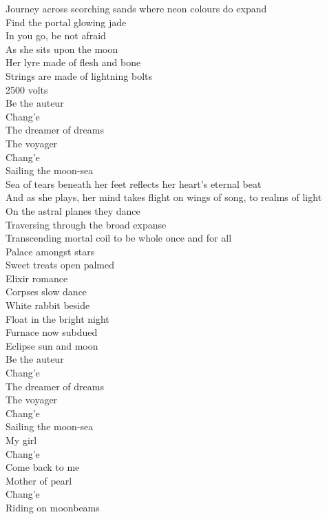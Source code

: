 Journey across scorching sands where neon colours do expand \\
Find the portal glowing jade \\
In you go, be not afraid \\
As she sits upon the moon \\
Her lyre made of flesh and bone \\
Strings are made of lightning bolts \\
2500 volts \\

Be the auteur \\
Chang'e \\
The dreamer of dreams \\
The voyager \\
Chang'e \\
Sailing the moon-sea \\

Sea of tears beneath her feet reflects her heart's eternal beat \\
And as she plays, her mind takes flight on wings of song, to realms of light \\
On the astral planes they dance \\
Traversing through the broad expanse \\
Transcending mortal coil to be whole once and for all \\

Palace amongst stars \\
Sweet treats open palmed \\
Elixir romance \\
Corpses slow dance \\
White rabbit beside \\
Float in the bright night \\
Furnace now subdued \\
Eclipse sun and moon \\

Be the auteur \\
Chang'e \\
The dreamer of dreams \\
The voyager \\
Chang'e \\
Sailing the moon-sea \\
My girl \\
Chang'e \\
Come back to me \\
Mother of pearl \\
Chang'e \\
Riding on moonbeams \\

